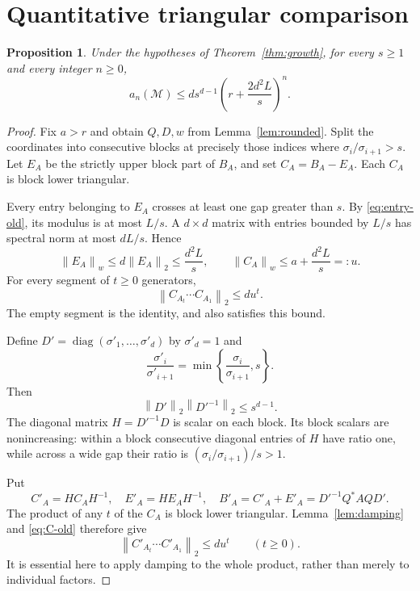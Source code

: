 \documentclass[11pt]{article}
\newtheorem{proposition}[theorem]{Proposition}
\theoremstyle{remark}\newtheorem{remark}[theorem]{Remark}
\newcommand{\norm}[1]{\left\lVert #1\right\rVert_2}
\newcommand{\opnorm}[2]{\left\lVert #1\right\rVert_{#2}}
\newcommand{\diag}{\operatorname{diag}}
\begin{document}
\section{Quantitative triangular comparison}
\begin{proposition}\label{prop:comparison}
Under the hypotheses of Theorem~\ref{thm:growth}, for every $s\geq1$ and every integer $n\geq0$,
\begin{equation}\label{eq:comparison}
 a_n(\mathcal M)\leq d s^{d-1}
                \left(r+\frac{2d^2L}{s}\right)^n.
\end{equation}
\end{proposition}
\begin{proof}
Fix $a>r$ and obtain $Q,D,w$ from Lemma~\ref{lem:rounded}. Split the coordinates into consecutive blocks at precisely those indices where $\sigma_i/\sigma_{i+1}>s$. Let $E_A$ be the strictly upper block part of $B_A$, and set $C_A=B_A-E_A$. Each $C_A$ is block lower triangular.

Every entry belonging to $E_A$ crosses at least one gap greater than $s$. By \eqref{eq:entry-old}, its modulus is at most $L/s$. A $d\times d$ matrix with entries bounded by $L/s$ has spectral norm at most $dL/s$. Hence
\[
 \opnorm{E_A}{w}\leq d\norm{E_A}\leq\frac{d^2L}{s},
 \qquad \opnorm{C_A}{w}\leq a+\frac{d^2L}{s}=:u.
\]
For every segment of $t\geq0$ generators,
\begin{equation}\label{eq:C-old}
 \norm{C_{A_t}\cdots C_{A_1}}\leq d u^t.
\end{equation}
The empty segment is the identity, and also satisfies this bound.

Define $D'=\diag(\sigma'_1,\ldots,\sigma'_d)$ by $\sigma'_d=1$ and
\[
 \frac{\sigma'_i}{\sigma'_{i+1}}
 =\min\left\{\frac{\sigma_i}{\sigma_{i+1}},s\right\}.
\]
Then
\begin{equation}\label{eq:condition}
 \norm{D'}\norm{D'^{-1}}\leq s^{d-1}.
\end{equation}
The diagonal matrix $H=D'^{-1}D$ is scalar on each block. Its block scalars are nonincreasing: within a block consecutive diagonal entries of $H$ have ratio one, while across a wide gap their ratio is $(\sigma_i/\sigma_{i+1})/s>1$.

Put
\[
 C'_A=HC_AH^{-1},\quad E'_A=HE_AH^{-1},\quad
 B'_A=C'_A+E'_A=D'^{-1}Q^*AQD'.
\]
The product of any $t$ of the $C_A$ is block lower triangular. Lemma~\ref{lem:damping} and \eqref{eq:C-old} therefore give
\begin{equation}\label{eq:C-new}
 \norm{C'_{A_t}\cdots C'_{A_1}}\leq d u^t
 \qquad(t\geq0).
\end{equation}
It is essential here to apply damping to the whole product, rather than merely to individual factors.


\end{proof}
\end{document}
